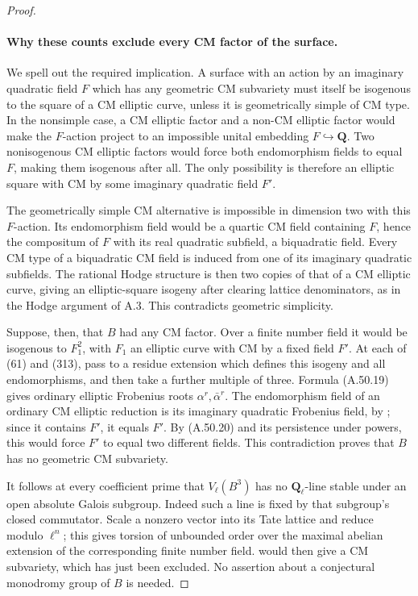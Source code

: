 \begin{proof}
\paragraph{Why these counts exclude every CM factor of the surface.}
We spell out the required implication. A surface
with an action by an imaginary quadratic field
\(F\) which has any geometric CM subvariety
must itself be isogenous to the square of a CM
elliptic curve, unless it is geometrically simple
of CM type. In the nonsimple case, a CM elliptic
factor and a non-CM elliptic factor would make the
\(F\)-action project to an impossible unital
embedding \(F\hookrightarrow\mathbf Q\).
Two nonisogenous CM elliptic factors would force
both endomorphism fields to equal \(F\), making
them isogenous after all. The only possibility
is therefore an elliptic square with CM by some
imaginary quadratic field \(F'\).

The geometrically simple CM alternative is impossible
in dimension two with this \(F\)-action. Its
endomorphism field would be a quartic CM field
containing \(F\), hence the compositum of \(F\)
with its real quadratic subfield, a biquadratic
field. Every CM type of a biquadratic CM field is
induced from one of its imaginary quadratic
subfields. The rational Hodge structure is then
two copies of that of a CM elliptic curve, giving
an elliptic-square isogeny after clearing lattice
denominators, as in the Hodge argument of A.3.
This contradicts geometric simplicity.

Suppose, then, that \(B\) had any CM factor.
Over a finite number field it would be isogenous
to \(F_1^2\), with \(F_1\) an elliptic curve
with CM by a fixed field \(F'\). At each of
(61) and (313), pass to a residue extension which
defines this isogeny and all endomorphisms, and
then take a further multiple of three. Formula
(A.50.19) gives ordinary elliptic Frobenius roots
\(\alpha^r,\bar\alpha^r\). The endomorphism
field of an ordinary CM elliptic reduction is
its imaginary quadratic Frobenius field, by
\cite[Theorem V.3.1]{fghSilvermanAEC}; since
it contains \(F'\), it equals \(F'\).
By (A.50.20) and its persistence under powers,
this would force \(F'\) to equal two different
fields. This contradiction proves that \(B\)
has no geometric CM subvariety.

It follows at every coefficient prime that
\(V_\ell(B^3)\) has no \(\mathbf Q_\ell\)-line
stable under an open absolute Galois subgroup.
Indeed such a line
is fixed by that subgroup's closed commutator.
Scale a nonzero vector into its Tate lattice and
reduce modulo \(\ell^n\); this gives torsion
of unbounded order over the maximal abelian
extension of the corresponding finite number
field. \cite[\S1, Corollary 1]{Ruppert1998}
would then give a CM subvariety, which has just
been excluded. No assertion about a conjectural
monodromy group of \(B\) is needed.


\end{proof}
